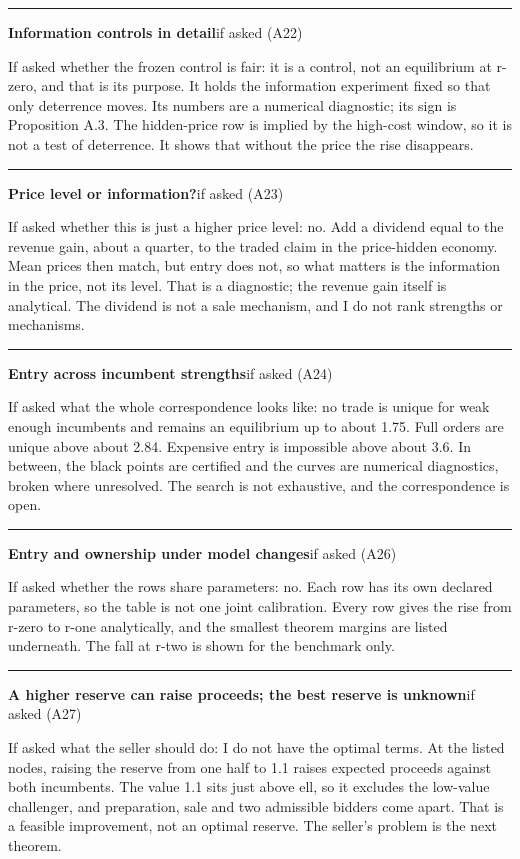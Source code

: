 \documentclass[11pt]{article}
\newcommand{\scriptframe}[3]{%
  \Needspace{9\baselineskip}%
  \par\medskip\noindent\textcolor{ScriptBlue}{\rule{\linewidth}{0.55pt}}%
  \par\smallskip\noindent
  \textbf{#1}\hfill\textcolor{ScriptGray}{\small #2}\par\smallskip
  #3\par}
\begin{document}
\scriptframe{Information controls in detail}{if asked (A22)}{%
  If asked whether the frozen control is fair: it is a control, not an
  equilibrium at r-zero, and that is its purpose. It holds the information
  experiment fixed so that only deterrence moves. Its numbers are a numerical
  diagnostic; its sign is Proposition A.3. The hidden-price row is implied by
  the high-cost window, so it is not a test of deterrence. It shows that without
  the price the rise disappears.
}

\scriptframe{Price level or information?}{if asked (A23)}{%
  If asked whether this is just a higher price level: no. Add a dividend equal
  to the revenue gain, about a quarter, to the traded claim in the price-hidden
  economy. Mean prices then match, but entry does not, so what matters is the
  information in the price, not its level. That is a diagnostic; the revenue
  gain itself is analytical. The dividend is not a sale mechanism, and I do not
  rank strengths or mechanisms.
}

\scriptframe{Entry across incumbent strengths}{if asked (A24)}{%
  If asked what the whole correspondence looks like: no trade is unique for weak
  enough incumbents and remains an equilibrium up to about 1.75. Full orders are
  unique above about 2.84. Expensive entry is impossible above about 3.6. In
  between, the black points are certified and the curves are numerical
  diagnostics, broken where unresolved. The search is not exhaustive, and the
  correspondence is open.
}

\scriptframe{Entry and ownership under model changes}{if asked (A26)}{%
  If asked whether the rows share parameters: no. Each row has its own declared
  parameters, so the table is not one joint calibration. Every row gives the
  rise from r-zero to r-one analytically, and the smallest theorem margins are
  listed underneath. The fall at r-two is shown for the benchmark only.
}

\scriptframe{A higher reserve can raise proceeds; the best reserve is unknown}{if asked (A27)}{%
  If asked what the seller should do: I do not have the optimal terms. At the
  listed nodes, raising the reserve from one half to 1.1 raises expected
  proceeds against both incumbents.
  The value 1.1 sits just above ell, so it excludes the low-value challenger,
  and preparation, sale and two admissible bidders come apart. That is a
  feasible improvement, not an optimal reserve. The seller's problem is the next
  theorem.
}
\end{document}
